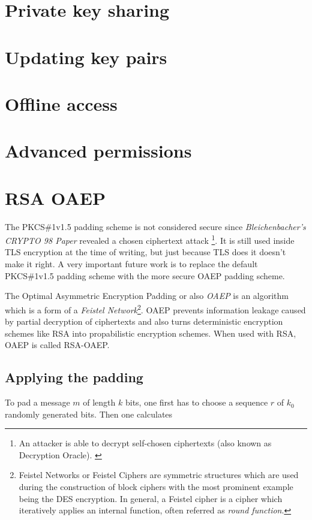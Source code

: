 \section{Private key sharing}
\section{Updating key pairs}
\section{Offline access}
\section{Advanced permissions}

\section{RSA OAEP}

The PKCS\#1v1.5 padding scheme is not considered secure since
\textit{Bleichenbacher's CRYPTO 98 Paper} \cite{rsabulletin}
revealed a chosen ciphertext attack \footnote{
  An attacker is able to decrypt self-chosen ciphertexts (also
  known as Decryption Oracle). \cite[p. 70]{baumann2014kryptographische}
}.
It is still used inside TLS encryption at the time of writing,
but just because TLS does it doesn't make it right. A very important
future work is to replace the default PKCS\#1v1.5 padding scheme with
the more secure OAEP padding scheme.

The Optimal Asymmetric Encryption Padding or also \textit{OAEP}
is an algorithm which is a form of a \textit{Feistel Network}\footnote{
  Feistel Networks or Feistel Ciphers are symmetric structures which are used
  during the construction of block ciphers with the most prominent example
  being the DES encryption. In general, a Feistel cipher is a cipher which
  iteratively applies an internal function, often referred as \textit{round function}.
}. OAEP prevents information leakage caused by partial decryption of 
ciphertexts and also turns deterministic encryption schemes like RSA into
propabilistic encryption schemes. When used with RSA, OAEP is called
RSA-OAEP.

\subsection{Applying the padding}

To pad a message $m$ of length $k$ bits, one first has to choose a sequence
$r$ of $k_0$ randomly generated bits. Then one calculates

